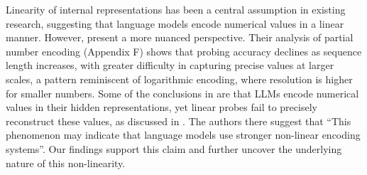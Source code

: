 

 

Linearity of internal representations \cite{park2023linear} has been a central assumption in existing research, suggesting that language models encode numerical values in a linear manner. However, \citet{zhu2025language} present a more nuanced perspective. Their analysis of partial number encoding (Appendix F) shows that probing accuracy declines as sequence length increases, with greater difficulty in capturing precise values at larger scales, a pattern reminiscent of logarithmic encoding, where resolution is higher for smaller numbers. Some of the conclusions in \citet{zhu2025language} are that LLMs encode numerical values in their hidden representations, yet linear probes fail to precisely reconstruct these values, as discussed in \citet[Section 3.1]{zhu2025language}. The authors there suggest that ``This phenomenon may indicate that language models use stronger non-linear encoding systems''.  Our findings support this claim and further uncover the underlying nature of this non-linearity.

